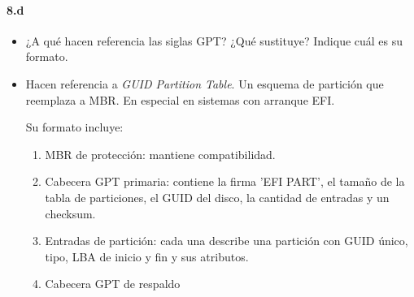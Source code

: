 \documentclass[10pt,a4paper]{paper}
\begin{document}
	\paragraph{8.d}
	\begin{itemize}
		\item ¿A qué hacen referencia las siglas GPT? ¿Qué sustituye? Indique cuál es
		su formato.
		
		\item Hacen referencia a \textit{GUID Partition Table}. Un esquema de partición
		que reemplaza a MBR. En especial en sistemas con arranque EFI.
		
		Su formato incluye:
		
		\begin{enumerate}
			\item MBR de protección: mantiene compatibilidad.
			
			\item Cabecera GPT primaria: contiene la firma 'EFI PART', el tamaño de la
			tabla de particiones, el GUID del disco, la cantidad de entradas y un checksum. 
			
			\item Entradas de partición: cada una describe una partición con GUID único,
			tipo, LBA de inicio y fin y sus atributos.
			
			
			\item Cabecera GPT de respaldo
			
		\end{enumerate}
		
	\end{itemize}
	
	
	
\end{document}

